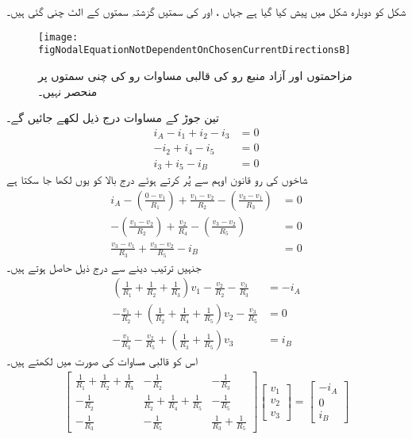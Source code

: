 شکل  کو دوبارہ شکل  میں پیش کیا گیا ہے جہاں ،  اور  کی سمتیں گزشتہ سمتوں کے الٹ چنی گئی ہیں۔
\begin{figure}
\centering
\texttt{[image: figNodalEquationNotDependentOnChosenCurrentDirectionsB]}
\caption{مزاحمتوں اور آزاد منبع رو کی قالبی مساوات رو کی چنی سمتوں پر منحصر نہیں۔}
\label{شکل_جوڑ_چار_جوڑ_تین_آزاد_مساوات_ب}
\end{figure}%
تین جوڑ کے مساوات درج ذیل لکھے جائیں گے۔
\begin{align*}
i_A-i_1+i_2-i_3&=0\\
-i_2+i_4-i_5&=0\\
i_3+i_5-i_B&=0
\end{align*}
شاخوں کی رو قانون اوہم سے پُر کرتے ہوئے درج بالا کو یوں لکھا جا سکتا ہے
\begin{align*}
i_A-\left(\frac{0-v_1}{R_1}\right)+\frac{v_1-v_2}{R_2}-\left(\frac{v_3-v_1}{R_3}\right)&=0\\
-\left(\frac{v_1-v_2}{R_2}\right)+\frac{v_2}{R_4}-\left(\frac{v_3-v_2}{R_5}\right)&=0\\
\frac{v_3-v_1}{R_3}+\frac{v_3-v_2}{R_5}-i_B&=0
\end{align*}
جنہیں ترتیب دینے سے درج ذیل حاصل ہوتے ہیں۔
\begin{align}
\left(\frac{1}{R_1}+\frac{1}{R_2}+\frac{1}{R_3}\right) v_1-\frac{v_2}{R_2}-\frac{v_3}{R_3}&=-i_A \label{مساوات_جوڑ_پہلا_جوڑ}\\
-\frac{v_1}{R_2}+\left(\frac{1}{R_2}+\frac{1}{R_4}+\frac{1}{R_5}\right)v_2-\frac{v_3}{R_5}&=0 \label{مساوات_جوڑ_دوسرا_جوڑ}\\
-\frac{v_1}{R_3}-\frac{v_2}{R_5}+\left(\frac{1}{R_3}+\frac{1}{R_5}\right)v_3&=i_B \label{مساوات_جوڑ_تیسرا_جوڑ}
\end{align}
اس کو قالبی مساوات کی صورت میں لکھتے ہیں۔
\begin{align}\label{مساوات_جوڑ_آزاد_مساوات_دو_جوڑ_پ}
\begin{bmatrix}
\frac{1}{R_1}+\frac{1}{R_2}+\frac{1}{R_3} & -\frac{1}{R_2} &- \frac{1}{R_3}\\[6pt]
-\frac{1}{R_2}&\frac{1}{R_2}+\frac{1}{R_4}+\frac{1}{R_5}& -\frac{1}{R_5}\\[6pt]
-\frac{1}{R_3} & -\frac{1}{R_5}&\frac{1}{R_3}+\frac{1}{R_5}
\end{bmatrix}
\begin{bmatrix}
v_1\\[6pt]
v_2\\[6pt]
v_3
\end{bmatrix}
=
\begin{bmatrix}
-i_A\\[6pt]
0\\[6pt]
i_B
\end{bmatrix}
\end{align}

